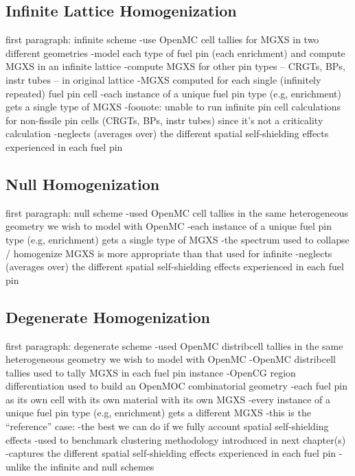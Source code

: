 \subsection{Infinite Lattice Homogenization}
\label{subsec:chap8-infinite}

first paragraph: infinite scheme
-use OpenMC cell tallies for \ac{MGXS} in two different geometries
-model each type of fuel pin (each enrichment) and compute \ac{MGXS} in an infinite lattice
-compute \ac{MGXS} for other pin types -- \acp{CRGT}, \acp{BP}, instr tubes -- in original lattice
-\ac{MGXS} computed for each single (infinitely repeated) fuel pin cell 
-each instance of a unique fuel pin type (e.g, enrichment) gets a single type of \ac{MGXS}
-foonote: unable to run infinite pin cell calculations for non-fissile pin cells (CRGTs, BPs, instr tubes) since it's not a criticality calculation
-neglects (averages over) the different spatial self-shielding effects experienced in each fuel pin

\subsection{Null Homogenization}
\label{subsec:chap8-null}

first paragraph: null scheme
-used OpenMC cell tallies in the same heterogeneous geometry we wish to model with OpenMC
-each instance of a unique fuel pin type (e.g, enrichment) gets a single type of \ac{MGXS}
-the spectrum used to collapse / homogenize \ac{MGXS} is more appropriate than that used for infinite
-neglects (averages over) the different spatial self-shielding effects experienced in each fuel pin

\subsection{Degenerate Homogenization}
\label{subsec:chap8-degenerate}

first paragraph: degenerate scheme
-used OpenMC distribcell tallies in the same heterogeneous geometry we wish to model with OpenMC
-OpenMC distribcell tallies used to tally \ac{MGXS} in each fuel pin instance
-OpenCG region differentiation used to build an OpenMOC combinatorial geometry
  -each fuel pin as its own cell with its own material with its own \ac{MGXS}
-every instance of a unique fuel pin type (e.g, enrichment) gets a different \ac{MGXS}
-this is the ``reference'' case:
  -the best we can do if we fully account spatial self-shielding effects
  -used to benchmark clustering methodology introduced in next chapter(s)
-captures the different spatial self-shielding effects experienced in each fuel pin
  -unlike the infinite and null schemes


